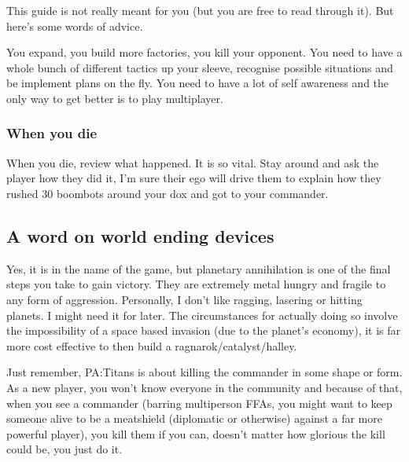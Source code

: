 \documentclass[]{article}
\begin{document}
This guide is not really meant for you (but you are free to read through it).  But here's some words of advice.  

You expand, you build more factories, you kill your opponent.  You need to have a whole bunch of different tactics up your sleeve, recognise possible situations and be implement plans on the fly.  You need to have a lot of self awareness and the only way to get better is to play multiplayer.
  

\subsubsection{When you die}  

When you die, review what happened.  It is so vital.  Stay around and ask the player how they did it, I'm sure their ego will drive them to explain how they rushed 30 boombots around your dox and got to your commander.    


\subsection{A word on world ending devices}

Yes, it is in the name of the game, but planetary annihilation is one of the final steps you take to gain victory.  They are extremely metal hungry and fragile to any form of aggression.  Personally, I don't like ragging, lasering or hitting planets.  I might need it for later.  The circumstances for actually doing so involve the impossibility of a space based invasion (due to the planet's economy), it is far more cost effective to then build a ragnarok/catalyst/halley.  

Just remember, PA:Titans is about killing the commander in some shape or form.  As a new player, you won't know everyone in the community and because of that, when you see a commander (barring multiperson FFAs, you might want to keep someone alive to be a meatshield (diplomatic or otherwise) against a far more powerful player), you kill them if you can, doesn't matter how glorious the kill could be, you just do it.  
\end{document}
